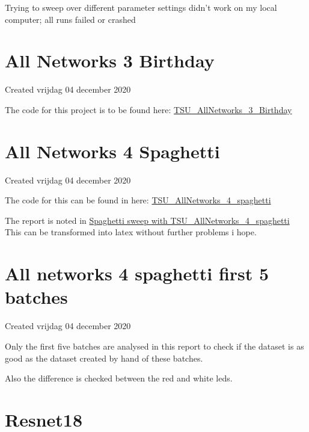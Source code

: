 \documentclass{article}
\begin{document}
Trying to sweep over different parameter settings didn't work on my local computer; all runs failed or crashed


		\section{All Networks 3 Birthday}

Created vrijdag 04 december 2020



The code for this project is to be found here: \href{https://colab.research.google.com/drive/1_DKPtHi231TMalsj-uaBLytjcX2DuyV4#scrollTo=vmsTN_T4xoXP}{TSU\_AllNetworks\_3\_Birthday}


		\section{All Networks 4 Spaghetti}

Created vrijdag 04 december 2020



The code for this can be found in here: \href{https://colab.research.google.com/drive/1kKCU9pAsVRqNR-lX1p45Z7BLTxp76CMq}{TSU\_AllNetworks\_4\_spaghetti}





The report is noted in \href{https://wandb.ai/dplars/pytorch-TWI_spaghetti_sweep/reports/Spaghetti-sweep-with-TSU_AllNetworks_4_spaghetti--VmlldzozNTIxNjM}{Spaghetti sweep with TSU\_AllNetworks\_4\_spaghetti} This can be transformed into latex without further problems i hope.


		\section{All networks 4 spaghetti first 5 batches}

Created vrijdag 04 december 2020



Only the first five batches are analysed in this report to check if the dataset is as good as the dataset created by hand of these batches.

Also the difference is checked between the red and white leds.




		
		\section{Resnet18}
\end{document}

